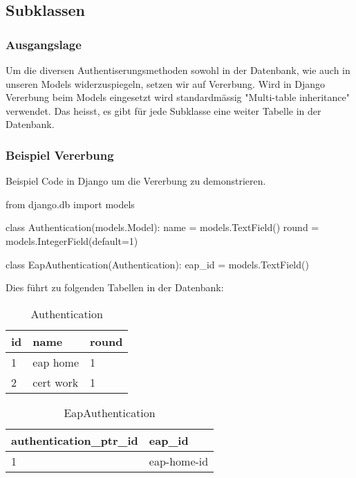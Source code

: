 \subsection{Subklassen}
\label{subklassen}
\subsubsection{Ausgangslage}
Um die diversen Authentiserungsmethoden sowohl in der Datenbank, wie auch in unseren Models widerzuspiegeln, setzen wir auf Vererbung. Wird in Django Vererbung beim Models eingesetzt wird standardmässig "Multi-table inheritance" verwendet. Das heisst, es gibt für jede Subklasse eine weiter Tabelle in der Datenbank.

\subsubsection{Beispiel Vererbung}
Beispiel Code in Django um die Vererbung zu demonstrieren.
\medskip
\begin{python}
from django.db import models

class Authentication(models.Model):
    name = models.TextField()
    round = models.IntegerField(default=1)

class EapAuthentication(Authentication):
    eap_id = models.TextField()
\end{python}

\medskip
Dies führt zu folgenden Tabellen in der Datenbank:\\

\begin{table}[H]
	\centering
    \begin{tabular}{|p{3cm}|p{3cm}|p{3cm}|}
    \hline    
    \rowcolor{lightblue}
	id & name & round \\ \hline   
	1 & eap home & 1 \\ \hline
	2 & cert work & 1 \\ \hline
    \end{tabular}
    \caption[Authentication]{Authentication}
\end{table}
\vspace*{1 cm}
\begin{table}[H]
	\centering
    \begin{tabular}{|p{4.5cm}|p{4.5cm}|}
    \hline    
    \rowcolor{lightblue}
	authentication\_ptr\_id & eap\_id \\ \hline   
	1 & eap-home-id  \\ \hline
    \end{tabular}
    \caption[EapAuthentication]{EapAuthentication}
\end{table}
\medskip

